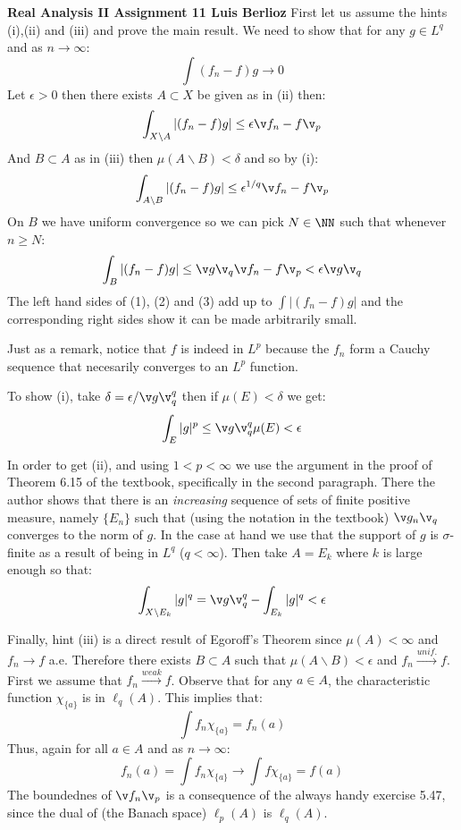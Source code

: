 \noindent\textbf{Real Analysis II Assignment 11 \hspace{\fill} Luis Berlioz}
First let us assume the hints (i),(ii) and (iii) and prove the main result. We need to show that for any $g\in L^q$ and as $n\to \infty$:
$$\int (f_n-f)g\to 0$$
Let $\epsilon>0$ then there exists $A\subset X$ be given as in (ii) then:
\begin{equation}
\int_{X\backslash A} \left| (f_n-f)g\right|\leq \epsilon \v f_n -f\v_p
\end{equation}
And $B\subset A$ as in (iii) then $\mu(A\backslash B)<\delta$ and so by (i):
\begin{equation}
\int_{A\backslash B} \left| (f_n-f)g\right|\leq \epsilon^{1/q}\v f_n-f\v_p
\end{equation}
On $B$ we have uniform convergence so we can pick $N\in \NN$ such that whenever $n\geq N$:
\begin{equation}
\int_{B} \left| (f_n-f)g\right|\leq \v g\v_q\v f_n -f\v_p<\epsilon \v g\v_q 
\end{equation}
The left hand sides of (1), (2) and (3) add up to $\int \left| (f_n-f)g\right|$ and the corresponding right sides show it can be made arbitrarily small.

Just as a remark, notice that $f$ is indeed in $L^p$ because the $f_n$ form a Cauchy sequence that necesarily converges to an $L^p$ function.

To show (i), take $\delta =\epsilon/\v g\v_q^q$ then if $\mu(E)<\delta$ we get:
$$\int_E | g|^p \leq \v g\v^q_q \mu(E) < \epsilon$$

In order to get (ii), and using $1<p<\infty$ we use the argument in the proof of Theorem 6.15 of the textbook, specifically in the second paragraph. 
There the author shows that there is an \emph{increasing} sequence of sets of finite positive measure, namely $\{E_n\}$ such that (using the notation in the textbook) $\v g_n\v_q$  converges to the norm of $g$.
In the case at hand we use that the support of $g$ is $\sigma$-finite as a result of being in $L^q$ ($q<\infty$).
 Then take $A=E_k$ where $k$ is large enough so that:
$$\int_{X\backslash E_k} |g|^q = \v g\v_q^q - \int_{E_k} |g|^q<\epsilon$$

Finally, hint (iii) is a direct result of Egoroff's Theorem since $\mu(A)<\infty$ and $f_n \to f$ a.e. Therefore there exists $B\subset A$ such that $\mu(A\backslash B)<\epsilon$ and $f_n\xrightarrow{unif.} f$.
First we assume that $f_n\xrightarrow{weak}f$. Observe that for any $a\in A$, the characteristic function $\chi_{\{a\}}$ is in $\ell_q(A)$. This implies that: 
$$\int f_n \chi_{\{a\}} = f_n(a)$$
Thus, again for all $a\in A$ and as $n\to \infty$:
$$f_n(a) = \int f_n \chi_{\{a\}} \to \int f\chi_{\{a\}}=f(a)$$
The boundednes of $\v f_n \v_p$ is a consequence of the always handy exercise 5.47, since the dual of (the Banach space) $\ell_p(A)$ is $\ell_q(A)$. 

